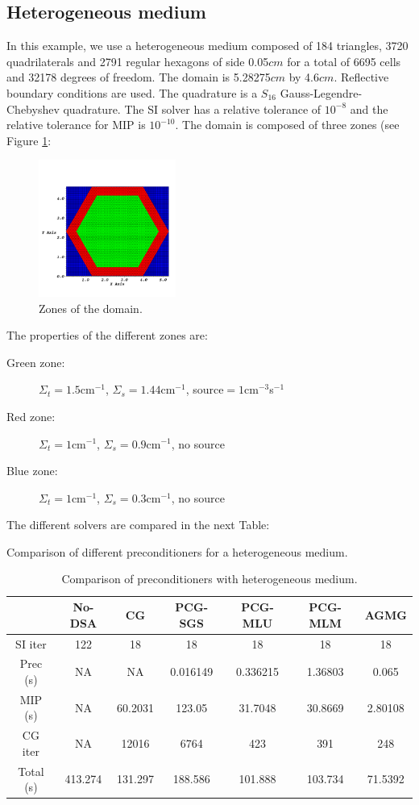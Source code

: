 \subsection{Heterogeneous medium}
In this example, we use a heterogeneous medium composed of 184 triangles, 3720
quadrilaterals and 2791 regular hexagons of side 0.05$cm$ for a total of 6695 
cells and 32178 degrees of freedom. The domain is 5.28275$cm$ by 4.6$cm$. 
Reflective boundary conditions are used. The quadrature is a $S_{16}$ 
Gauss-Legendre-Chebyshev quadrature. The SI solver has a relative tolerance of 
$10^{-8}$ and the relative tolerance for MIP is $10^{-10}$. The domain is 
composed of three zones (see Figure \ref{fig_zone_hex}:
\begin{figure}[H]
  \centering
  \includegraphics[width=0.4\textwidth]{./Dsa/source_crop}
  \caption{Zones of the domain.}
  \label{fig_zone_hex}
\end{figure}
The properties of the different zones are:
\begin{description}
  \item[Green zone:] $\Sigma_t =1.5$cm$^{-1}$, $\Sigma_s = 1.44$cm$^{-1}$, source$ =
    1$cm$^{-3}$s$^{-1}$
  \item[Red zone:] $\Sigma_t = 1$cm$^{-1}$, $\Sigma_s = 0.9$cm$^{-1}$, no source
  \item[Blue zone:] $\Sigma_t = 1$cm$^{-1}$, $\Sigma_s = 0.3$cm$^{-1}$, no source
\end{description}
The different solvers are compared in the next Table:
\begin{table}[H]
  \begin{center}
    \caption{Comparison of different preconditioners for a heterogeneous medium.}
    \begin{tabular}{|c|c|c|c|c|c|c|}
      \hline
      & No-DSA & CG & PCG-SGS & PCG-MLU & PCG-MLM & AGMG\\
      \hline
      SI iter   & 122      & 18      & 18       & 18       & 18      & 18 \\
      Prec (s)  & NA       & NA      & 0.016149 & 0.336215 & 1.36803 & 0.065 \\
      MIP (s)   & NA       & 60.2031 & 123.05   & 31.7048  & 30.8669 & 2.80108\\
      CG iter   & NA       & 12016   & 6764     & 423      & 391     & 248 \\
      Total (s) & 413.274  & 131.297 & 188.586  & 101.888  & 103.734 & 71.5392\\
      \hline
    \end{tabular}
    \caption{Comparison of preconditioners with heterogeneous medium.}
  \end{center}
\end{table}
